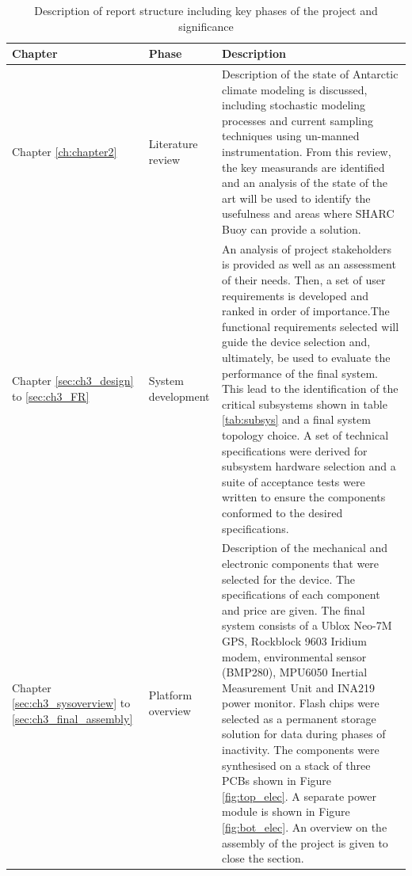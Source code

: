 \begin{center}
   {\setlength{\extrarowheight}{5pt}%
    \begin{longtable}[H]{|>{\RaggedRight}m{}| >{\centering}m{} | 
   m{}|}
        \caption{Description of report structure including key phases of the project and
        significance}
        \label{tab:report_structure}\\
        \hline
        \textbf{Chapter} & \textbf{Phase} & \textbf{Description} \\
        \hline
        Chapter \ref{ch:chapter2} & Literature review & Description of the state of Antarctic climate modeling is discussed, including stochastic modeling processes and current sampling techniques using un-manned instrumentation. From this review, the key measurands are identified and an analysis of the state of the art will be used to identify the usefulness and areas where SHARC Buoy can provide a solution. \\
        \hline
        Chapter \ref{sec:ch3_design} to \ref{sec:ch3_FR} & System development &  An analysis of project stakeholders is provided as well as an assessment of their needs. Then, a set of user requirements is developed and ranked in order of importance.The functional requirements selected will guide the device selection and, ultimately, be used to evaluate the performance of the final system. This lead to the identification of the critical subsystems shown in table \ref{tab:subsys} and a final system topology choice. A set of technical specifications were derived for subsystem hardware selection and a suite of acceptance tests were written to ensure the components conformed to the desired specifications.\\
        \hline
        Chapter \ref{sec:ch3_sysoverview} to \ref{sec:ch3_final_assembly} & Platform overview & Description of the mechanical and electronic components that were selected for the device. The specifications of each component and price are given. The final system consists of a Ublox Neo-7M GPS, Rockblock 9603 Iridium modem, environmental sensor (BMP280), MPU6050 Inertial Measurement Unit and INA219 power monitor. Flash chips were selected as a permanent storage solution for data during phases of inactivity. The components were synthesised on a stack of three PCBs shown in Figure \ref{fig:top_elec}. A separate power module is shown in Figure \ref{fig:bot_elec}. An overview on the assembly of the project is given to close the section.\\
        \hline

\end{longtable}}
\end{center}
